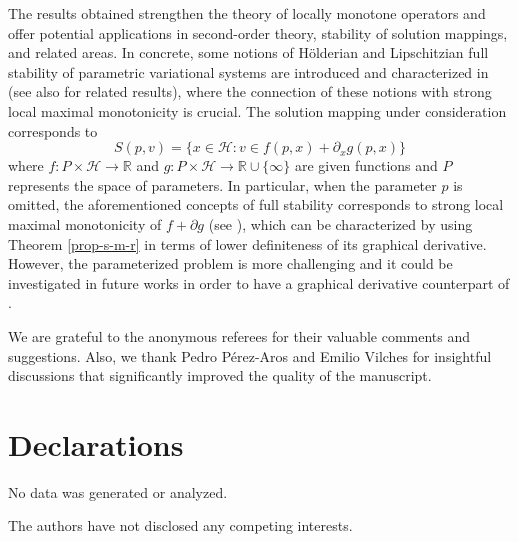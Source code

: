\documentclass[smallextended,envcountsect,envcountsame]{svjour3}
\newcounter{count}
\renewcommand{\H}{\mathcal{H}}
\newcommand{\R}{\mathbb{R}}
\newcommand{\1}{\mathds{1}}
\begin{document}
        The results obtained strengthen the theory of locally monotone operators and offer potential applications in second-order theory, stability of solution mappings, and related areas. In concrete, some notions of Hölderian and Lipschitzian full stability of parametric variational systems are introduced and characterized in \cite{MR3485980} (see also \cite{MR3881947} for related results), where the connection of these notions with strong local maximal monotonicity is crucial. The solution mapping under consideration corresponds to
        \begin{equation*}
            S(p,v) = \{ x\in \H : v\in f(p,x) + \partial_x g(p,x) \}
        \end{equation*}
        where $f\colon P\times \H\to \R$ and $g\colon P\times \H\to \R\cup\{\infty\}$ are given functions and $P$ represents the space of parameters. In particular, when the parameter $p$ is omitted, the aforementioned concepts of full stability corresponds to strong local maximal monotonicity of $f+\partial g$ (see \cite[Lemma 3.3]{MR3485980}), which can be characterized by using Theorem \ref{prop-s-m-r} in terms of lower definiteness of its graphical derivative. However, the parameterized problem is more challenging and it could be investigated in future works in order to have a graphical derivative counterpart of \cite[Theorem 4.3]{MR3485980}.
        

 We are grateful to the anonymous referees for their valuable comments and suggestions. Also, we thank Pedro Pérez-Aros and Emilio Vilches for insightful discussions that significantly improved the quality of the manuscript.

\section*{Declarations}
 No data was generated or analyzed.

  The authors have not disclosed any competing interests.

	
	
	
\end{document}
